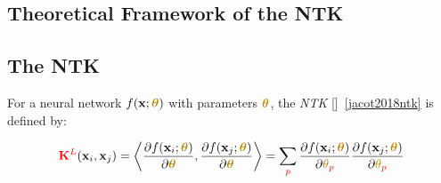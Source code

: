 \documentclass[a4paper]{article}
\theoremstyle{plain}
\theoremstyle{definition}
\theoremstyle{remark}
\begin{document}
\begin{center}
\begin{tcolorbox}[colback=gray!5,colframe=gray!50!black,title={\textbf{Framework Selection Decision Tree}},enhanced,drop shadow,width=0.9\textwidth]
\end{tcolorbox}
\end{center}




\subsection{Theoretical Framework of the NTK}




\subsection{The NTK}

For a neural network $f(\mathbf{x}; \boldsymbol{\textcolor{darkyellow}{\theta}})$ with parameters $\boldsymbol{\textcolor{darkyellow}{\theta}}$, the \textit{NTK} []~\ref{jacot2018ntk} is defined by:
\begin{tcolorbox}[colback=yellow!10,colframe=blue!40!black,title=Definition : NTK]
\begin{equation}
\label{eq:ntk_definition}
\textcolor{red}{\mathbf{K}^{L}}(\mathbf{x}_i, \mathbf{x}_j) = \left\langle \frac{\partial f(\mathbf{x}_i; \boldsymbol{\textcolor{darkyellow}{\theta}})}{\partial \boldsymbol{\textcolor{darkyellow}{\theta}}}, \frac{\partial f(\mathbf{x}_j; \boldsymbol{\textcolor{darkyellow}{\theta}})}{\partial \boldsymbol{\textcolor{darkyellow}{\theta}}} \right\rangle = \sum_{\textcolor{red}{p}} \frac{\partial f(\mathbf{x}_i; \boldsymbol{\textcolor{darkyellow}{\theta}})}{\partial \textcolor{darkyellow}{\theta}_{\textcolor{red}{p}}} \frac{\partial f(\mathbf{x}_j; \boldsymbol{\textcolor{darkyellow}{\theta}})}{\partial \textcolor{darkyellow}{\theta}_{\textcolor{red}{p}}}
\end{equation}
\end{tcolorbox}
\end{document}
